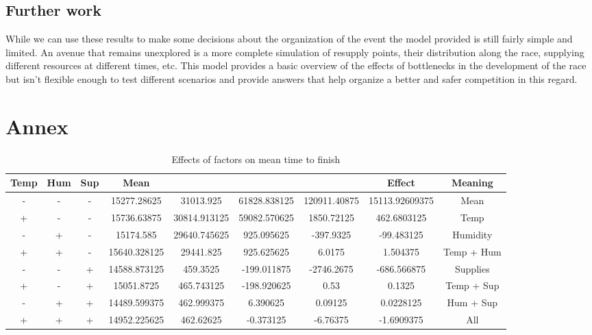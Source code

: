 \documentclass[conference]{IEEEtran}
\begin{document}
\subsection{Further work}

While we can use these results to make some decisions about the organization of the event the model provided is still fairly simple and limited. An avenue that remains unexplored is a more complete simulation of resupply points, their distribution along the race, supplying different resources at different times, etc. This model provides a basic overview of the effects of bottlenecks in the development of the race but isn't flexible enough to test different scenarios and provide answers that help organize a better and safer competition in this regard.

\newpage
\onecolumn
\section{Annex}

\begin{table}[h]
\caption{Effects of factors on mean time to finish}
\begin{center}
\begin{tabular}{|c|c|c|c|c|c|c|c|c|}
\hline
\textbf{Temp}&\textbf{Hum}&\textbf{Sup}&\textbf{Mean}&&&&\textbf{Effect}&\textbf{Meaning} \\
\hline
-&-&-&15277.28625&31013.925&61828.838125&120911.40875&15113.92609375&Mean \\
+&-&-&15736.63875&30814.913125&59082.570625&1850.72125&462.6803125&Temp \\
-&+&-&15174.585&29640.745625&925.095625&-397.9325&-99.483125&Humidity \\
+&+&-&15640.328125&29441.825&925.625625&6.0175&1.504375&Temp + Hum \\
-&-&+&14588.873125&459.3525&-199.011875&-2746.2675&-686.566875&Supplies \\
+&-&+&15051.8725&465.743125&-198.920625&0.53&0.1325&Temp + Sup \\ 
-&+&+&14489.599375&462.999375&6.390625&0.09125&0.0228125&Hum + Sup \\
+&+&+&14952.225625&462.62625&-0.373125&-6.76375&-1.6909375&All \\
\hline
\end{tabular}
\label{tab:rep_significance_2}
\end{center}
\end{table}
\end{document}
